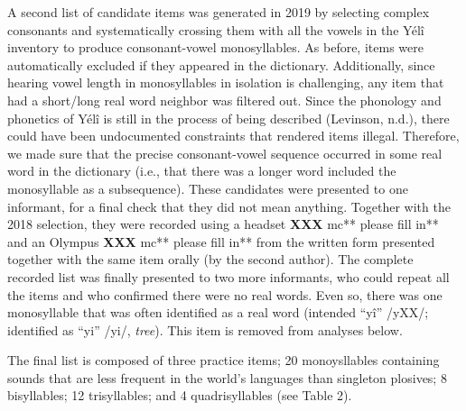 \documentclass[english,,man,floatsintext]{apa6}
\begin{document}
A second list of candidate items was generated in 2019 by selecting complex consonants and systematically crossing them with all the vowels in the Yélî inventory to produce consonant-vowel monosyllables. As before, items were automatically excluded if they appeared in the dictionary. Additionally, since hearing vowel length in monosyllables in isolation is challenging, any item that had a short/long real word neighbor was filtered out. Since the phonology and phonetics of Yélî is still in the process of being described (Levinson, n.d.), there could have been undocumented constraints that rendered items illegal. Therefore, we made sure that the precise consonant-vowel sequence occurred in some real word in the dictionary (i.e., that there was a longer word included the monosyllable as a subsequence). These candidates were presented to one informant, for a final check that they did not mean anything. Together with the 2018 selection, they were recorded using a headset \textbf{XXX }mc** please fill in** and an Olympus \textbf{XXX }mc** please fill in** from the written form presented together with the same item orally (by the second author). The complete recorded list was finally presented to two more informants, who could repeat all the items and who confirmed there were no real words. Even so, there was one monosyllable that was often identified as a real word (intended ``yî'' /yXX/; identified as ``yi'' /yi/, \emph{tree}). This item is removed from analyses below.

The final list is composed of three practice items; 20 monoysllables containing sounds that are less frequent in the world's languages than singleton plosives; 8 bisyllables; 12 trisyllables; and 4 quadrisyllables (see Table 2).
\end{document}
